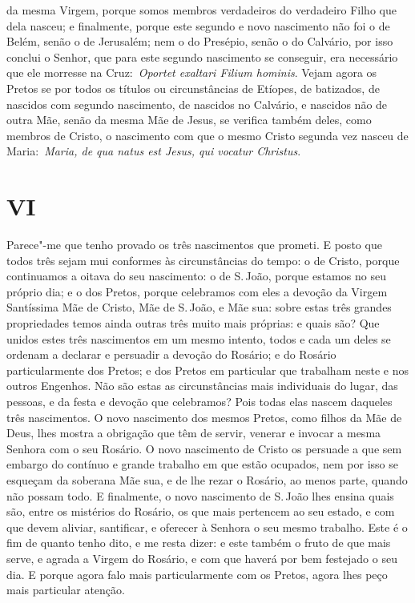 da mesma Virgem, porque somos membros verdadeiros do verdadeiro Filho
que dela nasceu; e finalmente, porque este segundo e novo nascimento não
foi o de Belém, senão o de Jerusalém; nem o do Presépio, senão o do
Calvário, por isso conclui o Senhor, que para este segundo nascimento se
conseguir, era necessário que ele morresse na Cruz:~\emph{Oportet
exaltari Filium hominis}. Vejam agora os Pretos se por todos os títulos
ou circunstâncias de Etíopes, de batizados, de nascidos com segundo
nascimento, de nascidos no Calvário, e nascidos não de outra Mãe, senão
da mesma Mãe de Jesus, se verifica também deles, como membros de Cristo,
o nascimento com que o mesmo Cristo segunda vez nasceu de
Maria:~\emph{Maria, de qua natus est Jesus, qui vocatur Christus}.


\section*{VI}

Parece"-me que tenho provado os três nascimentos que
prometi. E posto que todos três sejam mui conformes às circunstâncias do
tempo: o de Cristo, porque continuamos a oitava do seu nascimento: o de
S.\,João, porque estamos no seu próprio dia; e o dos Pretos, porque
celebramos com eles a devoção da Virgem Santíssima Mãe de Cristo, Mãe de
S.\,João, e Mãe sua: sobre estas três grandes propriedades temos ainda
outras três muito mais próprias: e quais são? Que unidos estes três
nascimentos em um mesmo intento, todos e cada um deles se ordenam a
declarar e persuadir a devoção do Rosário; e do Rosário particularmente
dos Pretos; e dos Pretos em particular que trabalham neste e nos outros
Engenhos. Não são estas as circunstâncias mais individuais do lugar, das
pessoas, e da festa e devoção que celebramos? Pois todas elas nascem
daqueles três nascimentos. O novo nascimento dos mesmos Pretos, como
filhos da Mãe de Deus, lhes mostra a obrigação que têm de servir,
venerar e invocar a mesma Senhora com o seu Rosário. O novo nascimento
de Cristo os persuade a que sem embargo do contínuo e grande trabalho em
que estão ocupados, nem por isso se esqueçam da soberana Mãe sua, e de
lhe rezar o Rosário, ao menos parte, quando não possam todo. E
finalmente, o novo nascimento de S.\,João lhes ensina quais são, entre os
mistérios do Rosário, os que mais pertencem ao seu estado, e com que
devem aliviar, santificar, e oferecer à Senhora o seu mesmo trabalho.
Este é o fim de quanto tenho dito, e me resta dizer: e este também o
fruto de que mais serve, e agrada a Virgem do Rosário, e com que haverá
por bem festejado o seu dia. E porque agora falo mais particularmente
com os Pretos, agora lhes peço mais particular atenção.

